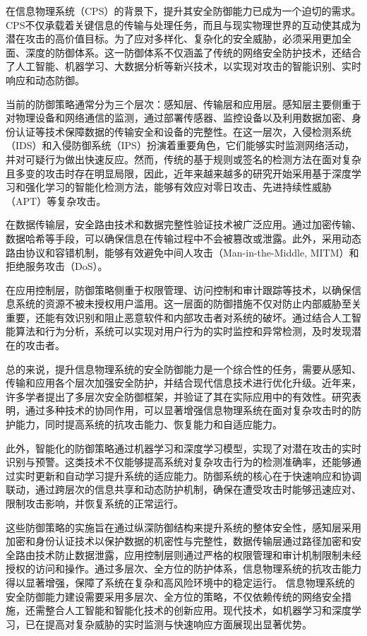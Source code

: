 在信息物理系统（CPS）的背景下，提升其安全防御能力已成为一个迫切的需求。CPS不仅承载着关键信息的传输与处理任务，而且与现实物理世界的互动使其成为潜在攻击的高价值目标。为了应对多样化、复杂化的安全威胁，必须采用更加全面、深度的防御体系。这一防御体系不仅涵盖了传统的网络安全防护技术，还结合了人工智能、机器学习、大数据分析等新兴技术，以实现对攻击的智能识别、实时响应和动态防御。

当前的防御策略通常分为三个层次：感知层、传输层和应用层。感知层主要侧重于对物理设备和网络通信的监测，通过部署传感器、监控设备以及利用数据加密、身份认证等技术保障数据的传输安全和设备的完整性。在这一层次，入侵检测系统（IDS）和入侵防御系统（IPS）扮演着重要角色，它们能够实时监测网络活动，并对可疑行为做出快速反应。然而，传统的基于规则或签名的检测方法在面对复杂且多变的攻击时存在明显局限，因此，近年来越来越多的研究开始采用基于深度学习和强化学习的智能化检测方法，能够有效应对零日攻击、先进持续性威胁（APT）等复杂攻击。

在数据传输层，安全路由技术和数据完整性验证技术被广泛应用。通过加密传输、数据哈希等手段，可以确保信息在传输过程中不会被篡改或泄露。此外，采用动态路由协议和容错机制，能够有效避免中间人攻击（Man-in-the-Middle, MITM）和拒绝服务攻击（DoS）。

在应用控制层，防御策略侧重于权限管理、访问控制和审计跟踪等技术，以确保信息系统的资源不被未授权用户滥用。这一层面的防御措施不仅对防止内部威胁至关重要，还能有效识别和阻止恶意软件和内部攻击者对系统的破坏。通过结合人工智能算法和行为分析，系统可以实现对用户行为的实时监控和异常检测，及时发现潜在的攻击者。

总的来说，提升信息物理系统的安全防御能力是一个综合性的任务，需要从感知、传输和应用各个层次加强安全防护，并结合现代信息技术进行优化升级。近年来，许多学者提出了多层次安全防御框架，并验证了其在实际应用中的有效性。研究表明，通过多种技术的协同作用，可以显著增强信息物理系统在面对复杂攻击时的防护能力，同时提高系统的抗攻击能力、恢复能力和自适应能力。

此外，智能化的防御策略通过机器学习和深度学习模型，实现了对潜在攻击的实时识别与预警。这类技术不仅能够提高系统对复杂攻击行为的检测准确率，还能够通过实时更新和自动学习提升系统的适应能力。防御系统的核心在于快速响应和协调联动，通过跨层次的信息共享和动态防护机制，确保在遭受攻击时能够迅速应对、限制攻击影响，并恢复系统的正常运行。

这些防御策略的实施旨在通过纵深防御结构来提升系统的整体安全性，感知层采用加密和身份认证技术以保护数据的机密性与完整性，数据传输层通过路径加密和安全路由技术防止数据泄露，应用控制层则通过严格的权限管理和审计机制限制未经授权的访问和操作。通过多层次、全方位的防护体系，信息物理系统的抗攻击能力得以显著增强，保障了系统在复杂和高风险环境中的稳定运行。
信息物理系统的安全防御能力建设需要采用多层次、全方位的策略，不仅依赖传统的网络安全措施，还需整合人工智能和智能化技术的创新应用。现代技术，如机器学习和深度学习，已在提高对复杂威胁的实时监测与快速响应方面展现出显著优势。

